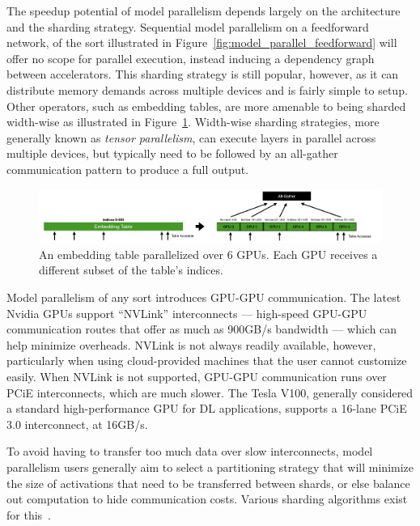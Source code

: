 The speedup potential of model parallelism depends largely on the architecture and the sharding strategy. Sequential model parallelism on a feedforward network, of the sort illustrated in Figure~\ref{fig:model_parallel_feedforward} will offer no scope for parallel execution, instead inducing a dependency graph between accelerators. This sharding strategy is still popular, however, as it can distribute memory demands across multiple devices and is fairly simple to setup. Other operators, such as embedding tables, are more amenable to being sharded width-wise as illustrated in Figure~\ref{fig:embedding_table_parallel}. Width-wise sharding strategies, more generally known as \textit{tensor parallelism}, can execute layers in parallel across multiple devices, but typically need to be followed by an all-gather communication pattern to produce a full output.

\begin{figure}[th!]
\centering
	\includegraphics[keepaspectratio=true, width=0.9\linewidth]{images/embedding_table_parallel}
	\caption{An embedding table parallelized over 6 GPUs. Each GPU receives a different subset of the table's indices.}
	\label{fig:embedding_table_parallel}
\end{figure}

Model parallelism of any sort introduces GPU-GPU communication. The latest Nvidia GPUs support ``NVLink'' interconnects --- high-speed GPU-GPU communication routes that offer as much as 900GB/s bandwidth --- which can help minimize overheads. NVLink is not always readily available, however, particularly when using cloud-provided machines that the user cannot customize easily. When NVLink is not supported, GPU-GPU communication runs over PCiE interconnects, which are much slower. The Tesla V100, generally considered a standard high-performance GPU for DL applications, supports a 16-lane PCiE 3.0 interconnect, at 16GB/s. 

To avoid having to transfer too much data over slow interconnects, model parallelism users generally aim to select a partitioning strategy that will minimize the size of activations that need to be transferred between shards, or else balance out computation to hide communication costs. Various sharding algorithms exist for this~\cite{flexflow2018,gpipe2019,lamp2020,mpanalysis2019,hydra2021,zero2019}.

